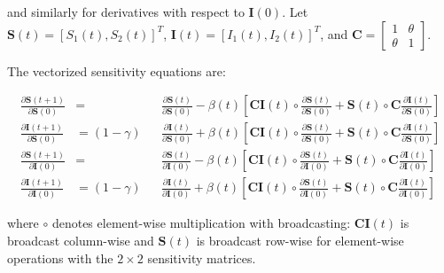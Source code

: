 and similarly for derivatives with respect to $\mathbf{I}(0)$. Let $\mathbf{S}(t) = [S_1(t), S_2(t)]^T$, $\mathbf{I}(t) = [I_1(t), I_2(t)]^T$, and $\mathbf{C} = \begin{bmatrix} 1 & \theta \\ \theta & 1 \end{bmatrix}$.

The vectorized sensitivity equations are:

\begin{align}
  \frac{\partial \mathbf{S}(t+1)}{\partial \mathbf{S}(0)} &= &&\frac{\partial \mathbf{S}(t)}{\partial \mathbf{S}(0)} - \beta(t) \left[ \mathbf{C} \mathbf{I}(t) \circ \frac{\partial \mathbf{S}(t)}{\partial \mathbf{S}(0)} + \mathbf{S}(t) \circ \mathbf{C} \frac{\partial \mathbf{I}(t)}{\partial \mathbf{S}(0)} \right] \\
  \frac{\partial \mathbf{I}(t+1)}{\partial \mathbf{S}(0)} &= (1-\gamma) &&\frac{\partial \mathbf{I}(t)}{\partial \mathbf{S}(0)} + \beta(t) \left[ \mathbf{C} \mathbf{I}(t) \circ \frac{\partial \mathbf{S}(t)}{\partial \mathbf{S}(0)} + \mathbf{S}(t) \circ \mathbf{C} \frac{\partial \mathbf{I}(t)}{\partial \mathbf{S}(0)} \right] \\
  \frac{\partial \mathbf{S}(t+1)}{\partial \mathbf{I}(0)} &= &&\frac{\partial \mathbf{S}(t)}{\partial \mathbf{I}(0)} - \beta(t) \left[ \mathbf{C} \mathbf{I}(t) \circ \frac{\partial \mathbf{S}(t)}{\partial \mathbf{I}(0)} + \mathbf{S}(t) \circ \mathbf{C} \frac{\partial \mathbf{I}(t)}{\partial \mathbf{I}(0)} \right] \\
  \frac{\partial \mathbf{I}(t+1)}{\partial \mathbf{I}(0)} &= (1-\gamma)&&\frac{\partial \mathbf{I}(t)}{\partial \mathbf{I}(0)} + \beta(t) \left[ \mathbf{C} \mathbf{I}(t) \circ \frac{\partial \mathbf{S}(t)}{\partial \mathbf{I}(0)} + \mathbf{S}(t) \circ \mathbf{C} \frac{\partial \mathbf{I}(t)}{\partial \mathbf{I}(0)} \right]
\end{align}

where $\circ$ denotes element-wise multiplication with broadcasting: $\mathbf{C} \mathbf{I}(t)$ is broadcast column-wise and $\mathbf{S}(t)$ is broadcast row-wise for element-wise operations with the $2 \times 2$ sensitivity matrices.

